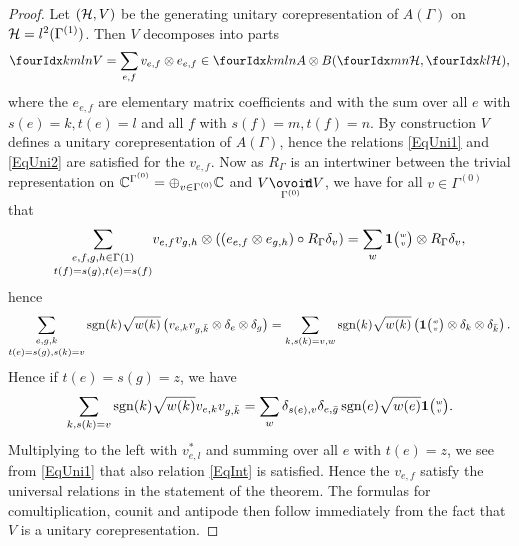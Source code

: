 \begin{proof} Let $(\mathcal{H},V)$ be the generating unitary corepresentation of $A(\Gamma)$ on $\mathcal{H} = l^2(\Gamma^{(1)})$. Then $V$ decomposes into parts \[ \Gr{V}{k}{l}{m}{n} = \sum_{e,f} v_{e,f} \otimes e_{e,f} \in \Gr{A}{k}{l}{m}{n}\otimes B(\Gru{\Hsp}{m}{n},\Gru{\Hsp}{k}{l}),\] where the $e_{e,f}$ are elementary matrix coefficients and with the sum over all $e$ with $s(e)=k,t(e)=l$ and all $f$ with $s(f) = m, t(f)=n$. By construction $V$ defines a unitary corepresentation of $A(\Gamma)$, hence the relations \eqref{EqUni1} and \eqref{EqUni2} are satisfied for the $v_{e,f}$. Now as $R_{\Gamma}$ is an intertwiner between the trivial representation on $\mathbb{C}^{\Gamma^{(0)}} = \oplus_{v\in \Gamma^{(0)}} \mathbb{C}$ and $V\Circtv{\Gamma^{(0)}} V$, we have for all $v\in \Gamma^{(0)}$ that \begin{equation}\label{EqMorR}\underset{t(f)=s(g),t(e)=s(f)}{\sum_{e,f,g,h\in \Gamma{(1)}}} v_{e,f}v_{g,h}\otimes \left((e_{e,f}\otimes e_{g,h})\circ R_{\Gamma} \delta_v\right) = \sum_w \mathbf{1}{\tiny {\begin{pmatrix} w\\v\end{pmatrix}}}\otimes R_{\Gamma}\delta_v,\end{equation} hence
\[\underset{t(e)=s(g),s(k)=v}{\sum_{e,g,k}} \operatorname{\mathrm{sgn}}(k)\sqrt{w(k)}\left( v_{e,k}v_{g,\bar{k}} \otimes \delta_e\otimes \delta_{g}\right) =\sum_{k,s(k)=v,w}\operatorname{\mathrm{sgn}}(k)\sqrt{w(k)} \left(\mathbf{1}{\tiny {\begin{pmatrix} w\\v\end{pmatrix}}} \otimes \delta_k\otimes \delta_{\bar{k}}\right).\] Hence if $t(e) = s(g)=z$, we have \[\sum_{k,s(k)=v} \operatorname{\mathrm{sgn}}(k)\sqrt{w(k)} v_{e,k}v_{g,\bar{k}} =\sum_w \delta_{s(e),v} \delta_{e,\bar{g}} \operatorname{\mathrm{sgn}}(e)\sqrt{w(e)}\mathbf{1}{\tiny {\begin{pmatrix} w\\v\end{pmatrix}}}.\] Multiplying to the left with $v_{e,l}^*$ and summing over all $e$ with $t(e) = z$, we see from \eqref{EqUni1} that also relation \eqref{EqInt} is satisfied. Hence the $v_{e,f}$ satisfy the universal relations in the statement of the theorem. The formulas for comultiplication, counit and antipode then follow immediately from the fact that $V$ is a unitary corepresentation.


\end{proof}
